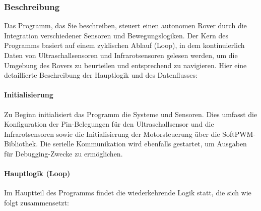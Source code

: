\documentclass{vorlage-design-main}
\begin{document}
\newpage

\hypertarget{beschreibung}{%
\subsubsection{Beschreibung}\label{beschreibung}}

Das Programm, das Sie beschreiben, steuert einen autonomen Rover durch
die Integration verschiedener Sensoren und Bewegungslogiken. Der Kern
des Programms basiert auf einem zyklischen Ablauf (Loop), in dem
kontinuierlich Daten von Ultraschallsensoren und Infrarotsensoren
gelesen werden, um die Umgebung des Rovers zu beurteilen und
entsprechend zu navigieren. Hier eine detaillierte Beschreibung der
Hauptlogik und des Datenflusses:

\hypertarget{initialisierung-1}{%
\paragraph{Initialisierung}\label{initialisierung-1}}

Zu Beginn initialisiert das Programm die Systeme und Sensoren. Dies
umfasst die Konfiguration der Pin-Belegungen für den Ultraschallsensor
und die Infrarotsensoren sowie die Initialisierung der Motorsteuerung
über die SoftPWM-Bibliothek. Die serielle Kommunikation wird ebenfalls
gestartet, um Ausgaben für Debugging-Zwecke zu ermöglichen.

\hypertarget{hauptlogik-loop}{%
\paragraph{Hauptlogik (Loop)}\label{hauptlogik-loop}}

Im Hauptteil des Programms findet die wiederkehrende Logik statt, die
sich wie folgt zusammensetzt:
\end{document}
